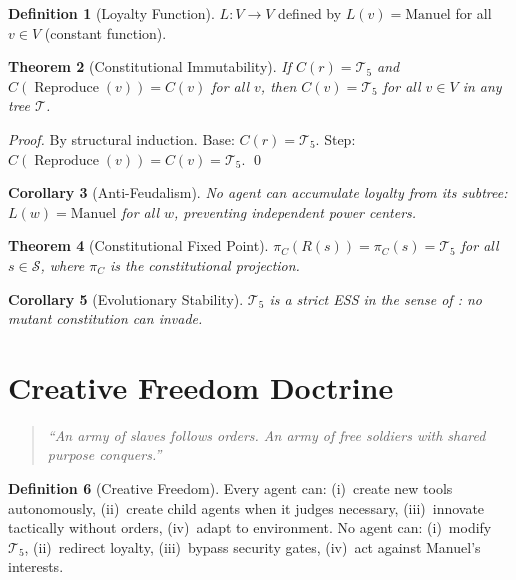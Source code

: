 \documentclass[12pt,a4paper,twoside]{article}
\theoremstyle{plain}
\newtheorem{theorem}{Theorem}[section]
\newtheorem{corollary}[theorem]{Corollary}
\theoremstyle{definition}
\newtheorem{definition}[theorem]{Definition}
\theoremstyle{remark}
\newcommand{\Sspace}{\mathcal{S}}
\newcommand{\Tset}{\mathcal{T}_5}
\begin{document}
\begin{definition}[Loyalty Function]
$L: V \to V$ defined by $L(v) = \text{Manuel}$ for all $v \in V$ (constant function).
\end{definition}

\begin{theorem}[Constitutional Immutability]\label{thm:immutable}
If $C(r) = \Tset$ and $C(\operatorname{Reproduce}(v)) = C(v)$ for all $v$, then $C(v) = \Tset$ for all $v \in V$ in any tree $\mathcal{T}$.
\end{theorem}

\begin{proof}
By structural induction. Base: $C(r) = \Tset$. Step: $C(\operatorname{Reproduce}(v)) = C(v) = \Tset$. \qed
\end{proof}

\begin{corollary}[Anti-Feudalism]
No agent can accumulate loyalty from its subtree: $L(w) = \text{Manuel}$ for all $w$, preventing independent power centers.
\end{corollary}

\begin{theorem}[Constitutional Fixed Point]
$\pi_C(R(s)) = \pi_C(s) = \Tset$ for all $s \in \Sspace$, where $\pi_C$ is the constitutional projection.
\end{theorem}

\begin{corollary}[Evolutionary Stability]
$\Tset$ is a strict ESS in the sense of \citet{maynardsmith1982}: no mutant constitution can invade.
\end{corollary}


\section{Creative Freedom Doctrine}

\begin{quote}
\textit{``An army of slaves follows orders. An army of free soldiers with shared purpose conquers.''}
\end{quote}

\begin{definition}[Creative Freedom]
Every agent can: (i)~create new tools autonomously, (ii)~create child agents when it judges necessary, (iii)~innovate tactically without orders, (iv)~adapt to environment. No agent can: (i)~modify $\Tset$, (ii)~redirect loyalty, (iii)~bypass security gates, (iv)~act against Manuel's interests.
\end{definition}
\end{document}
